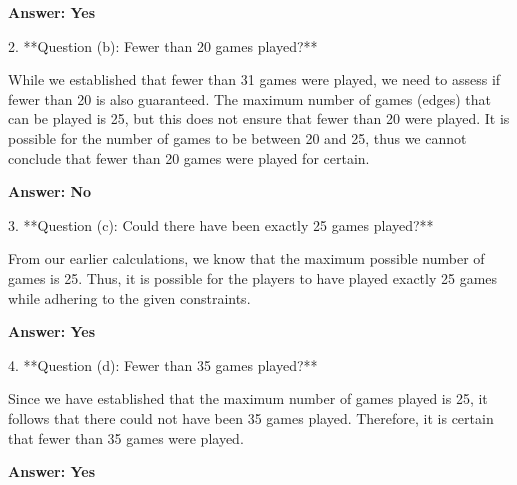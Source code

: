 \documentclass{article}
\begin{document}
\textbf{Answer: Yes}

2. **Question (b): Fewer than 20 games played?**

While we established that fewer than 31 games were played, we need to assess if fewer than 20 is also guaranteed. The maximum number of games (edges) that can be played is 25, but this does not ensure that fewer than 20 were played. It is possible for the number of games to be between 20 and 25, thus we cannot conclude that fewer than 20 games were played for certain.

\textbf{Answer: No}

3. **Question (c): Could there have been exactly 25 games played?**

From our earlier calculations, we know that the maximum possible number of games is 25. Thus, it is possible for the players to have played exactly 25 games while adhering to the given constraints.

\textbf{Answer: Yes}

4. **Question (d): Fewer than 35 games played?**

Since we have established that the maximum number of games played is 25, it follows that there could not have been 35 games played. Therefore, it is certain that fewer than 35 games were played.

\textbf{Answer: Yes}
\end{document}
